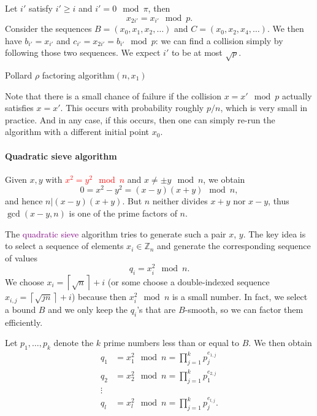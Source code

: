 \documentclass[a4paper, 11pt, openany]{book}
\numberwithin{equation}{section}
\theoremstyle{plain}
\theoremstyle{definition}
\newcommand{\Z}{\mathbb{Z}}
\newcommand{\Important}[1]{\textcolor{red}{#1}}
\newcommand{\Define}[1]{\textcolor{purple}{#1}}
\begin{document}
Let $i'$ satisfy $i' \ge i$ and $i' = 0 \mod \pi$, then
\[
    x_{2i'} = x_{i'} \mod p.
\]
Consider the sequences $B = (x_0, x_1, x_2, \dots)$ and $C = (x_0, x_2, x_4, \dots)$. We then have $b_{i'} = x_{i'}$ and $c_{i'} = x_{2i'} = b_{i'} \mod p$: we can find a collision simply by following those two sequences. We expect $i'$ to be at most $\sqrt{p}$.

\begin{algorithm}[H]
\caption{Pollard $\rho$ factoring algorithm$(n,x_1)$}
\begin{algorithmic}[1]
    \EndWhile
    \Else{}
    \EndIf
\end{algorithmic}
\end{algorithm}

Note that there is a small chance of failure if the collision $x = x' \mod p$ actually satisfies $x = x'$. This occurs with probability roughly $p/n$, which is very small in practice. And in any case, if this occurs, then one can simply re-run the algorithm with a different initial point $x_0$.

\paragraph{Quadratic sieve algorithm}

Given $x,y$ with \Important{$x^2 = y^2 \mod n$} and $x \ne \pm y \mod n$, we obtain
\[
    0 = x^2 - y^2 = (x-y)(x+y) \mod n,
\]
and hence $n | (x-y)(x+y)$. But $n$ neither divides $x+y$ nor $x-y$, thus $\gcd(x-y,n)$ is one of the prime factors of $n$.

The \Define{quadratic sieve} algorithm tries to generate such a pair $x$, $y$. The key idea is to select a sequence of elements $x_i \in \Z_n$ and generate the corresponding sequence of values
\[
    q_i = x_i^2 \mod n.
\]
We choose $x_i = \left\lceil \sqrt{n} \right\rceil + i$ (or some choose a double-indexed sequence $x_{i,j} = \left\lceil \sqrt{jn} \right\rceil + i$) because then $x_i^2 \mod n$ is a small number. In fact, we select a bound $B$ and we only keep the $q_i$'s that are $B$-smooth, so we can factor them efficiently. 

Let $p_1, \dots, p_k$ denote the $k$ prime numbers less than or equal to $B$. We then obtain
\begin{align*}
    q_1 &= x_1^2 \mod n = \prod_{j=1}^k p_j^{e_{1,j}}\\
    q_2 &= x_2^2 \mod n = \prod_{j=1}^k p_1^{e_{2,j}}\\
    \vdots\\
    q_l &= x_l^2 \mod n = \prod_{j=1}^k p_j^{e_{l,j}}.
\end{align*}
\end{document}
